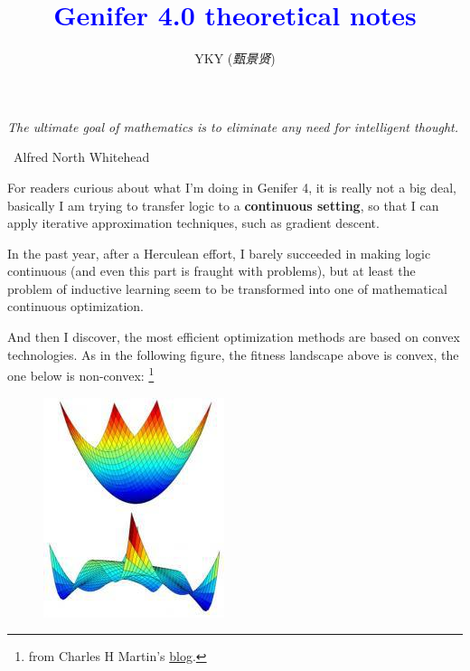 \documentclass[12pt]{article}
\title{\textcolor{blue}{Genifer 4.0 theoretical notes}}
\author{YKY (\textit{甄景贤})}
\newcommand{\tab}{\hspace*{1cm}}
\begin{document}
\tab\tab\tab \parbox{9cm}{\textit{The ultimate goal of mathematics is to eliminate any need for intelligent thought.}}
\begin{flushright}
\textemdash\, Alfred North Whitehead \hspace{1cm}
\end{flushright}

\sffamily

{\let\newpage\relax\maketitle}

\maketitle
\setlength{\parindent}{0em}
\setlength{\parskip}{1.5ex plus0.5ex minus1.2ex}

For readers curious about what I'm doing in Genifer 4, it is really not a big deal, basically I am trying to transfer logic to a \textbf{continuous setting}, so that I can apply iterative approximation techniques, such as gradient descent.

In the past year, after a Herculean effort, I barely succeeded in making logic continuous (and even this part is fraught with problems), but at least the problem of inductive learning seem to be transformed into one of mathematical continuous optimization.

And then I discover, the most efficient optimization methods are based on convex technologies.  As in the following figure, the fitness landscape above is convex, the one below is non-convex: \footnote{from Charles H Martin's \href{https://charlesmartin14.wordpress.com/2013/11/14/metric-learning-some-quantum-statistical-mechanics/}{blog}.}
\begin{figure}[H]
\centering
\includegraphics[scale=0.6]{convex-and-nonconvex.jpg}
\end{figure}
\end{document}
